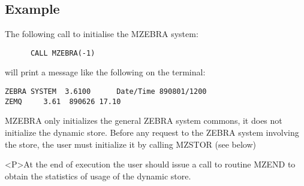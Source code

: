 \subsection{Example}
\par The following call to initialise the MZEBRA system:
\begin{verbatim}
      CALL MZEBRA(-1)
\end{verbatim}
will print a message like the following on the terminal:
\begin{verbatim}
ZEBRA SYSTEM  3.6100      Date/Time 890801/1200
ZEMQ     3.61  890626 17.10
\end{verbatim}
MZEBRA only initializes the general ZEBRA system commons,
it does not initialize the dynamic store.
Before any request to the ZEBRA system involving the store,
the user must initialize it by calling MZSTOR (see below)
\par <P>At the end of execution the user should issue a call to routine
MZEND to obtain
the statistics of usage of the dynamic store.
